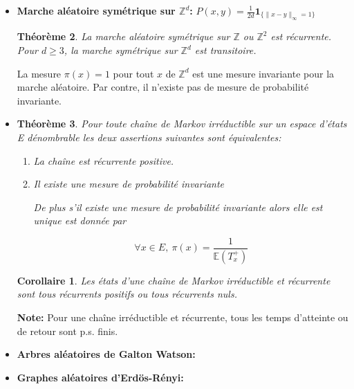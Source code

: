 \documentclass[10pt,a4paper,oneside]{article}
\newtheorem{theoreme}{Théorème}
\newtheorem{corollaire}{Corollaire}
\begin{document}
\begin{itemize}
\begin{theoreme}
\begin{itemize}
\[ \mathbb{P}_x(\mathcal{N}_x = \infty) = 1 \]

\item
Si un état $x$ est transitoire, le nombre de visites $\mathcal{N}_x$ d'une chaîne de Markov issue de $x$ suit une loit géométrique sur $\mathbb{N}$ de paramètre $\mathbb{P}_x(T_x^+ = \infty) > 0$. En particulier

\[ \mathbb{E}_x(\mathcal{N}_x) = \frac{1}{\mathbb{P}_x(T_x^+ = \infty)} \Rightarrow \mathbb{P}_x(N_x < \infty) = 1 \]

\end{itemize}
\end{theoreme}

\item
\textbf{Marche aléatoire symétrique sur $\mathbb{Z}^d$:} $P(x,y) = \frac{1}{2d} \textbf{1}_{ \{ \| x-y \|_\infty = 1 \}}$

\begin{theoreme}
La marche aléatoire symétrique sur $\mathbb{Z}$ ou $\mathbb{Z}^2$ est récurrente. Pour $d \geq 3$, la marche symétrique sur $\mathbb{Z}^d$ est transitoire.
\end{theoreme}

La mesure $\pi(x) = 1$ pour tout $x$ de $\mathbb{Z}^d$ est une mesure invariante pour la marche aléatoire. Par contre, il n'existe pas de mesure de probabilité invariante.

\item
\begin{theoreme}
Pour toute chaîne de Markov irréductible sur un espace d'états E dénombrable les deux assertions suivantes sont équivalentes:

\begin{enumerate}
\item
La chaîne est récurrente positive.
\item
Il existe une mesure de probabilité invariante

De plus s'il existe une mesure de probabilité invariante alors elle est unique est donnée par

\[ \forall x \in E,\ \pi(x) = \frac{1}{\mathbb{E}(T_x^+)} \]
\end{enumerate}
\end{theoreme}

\begin{corollaire}
Les états d'une chaîne de Markov irréductible et récurrente sont tous récurrents positifs ou tous récurrents nuls.
\end{corollaire}

\textbf{Note:} Pour une chaîne irréductible et récurrente, tous les temps d'atteinte ou de retour sont p.s. finis.

\item
\textbf{Arbres aléatoires de Galton Watson:}

\item
\textbf{Graphes aléatoires d'Erdös-Rényi:}

\end{itemize}
\end{document}
